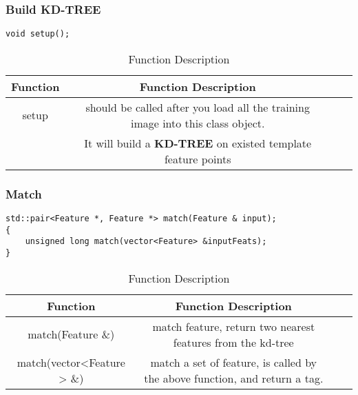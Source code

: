 \documentclass[paper=a4, fontsize=11pt]{scrartcl} %
\numberwithin{equation}{section} %
\numberwithin{figure}{section} %
\numberwithin{table}{section} %
\begin{document}
\subsubsection{Build KD-TREE}
\begin{lstlisting}
void setup();
\end{lstlisting}

\begin{table}[h]
    \centering
    \begin{tabular}{|c|c| lp{}}
        \hline
        \textbf{Function} & \textbf{Function Description} \\\hline
                    setup & should be called after you load all the training image into this class object. \\& It will build a \textbf{KD-TREE} on existed template feature points \\\hline
    \end{tabular}
    \caption{Function Description}\label{nolock}
\end{table}

\subsubsection{Match}

\begin{lstlisting}
std::pair<Feature *, Feature *> match(Feature & input);
{
    unsigned long match(vector<Feature> &inputFeats);
}
\end{lstlisting}

\begin{table}[h]
    \centering
    \begin{tabular}{|c|c| lp{}}
        \hline
        \textbf{Function} & \textbf{Function Description} \\\hline
            match(Feature \&) & match feature, return two nearest features from the kd-tree\\\hline
            match(vector<Feature > \&) & match a set of feature, is called by the above function, and return a tag.\\\hline
    \end{tabular}
    \caption{Function Description}\label{nolock}
\end{table}
\end{document}
